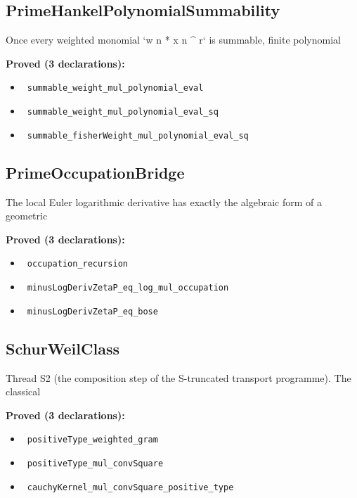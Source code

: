 \documentclass{report}
\theoremstyle{definition}
\begin{document}
\subsection{PrimeHankelPolynomialSummability}
Once every weighted monomial `w n * x n ^ r` is summable, finite polynomial

\noindent\textbf{Proved (3 declarations):}
\begin{itemize}
  \item {}\leanok\ \texttt{summable\_weight\_mul\_polynomial\_eval}
  \item {}\leanok\ \texttt{summable\_weight\_mul\_polynomial\_eval\_sq}
  \item {}\leanok\ \texttt{summable\_fisherWeight\_mul\_polynomial\_eval\_sq}
\end{itemize}

\subsection{PrimeOccupationBridge}
The local Euler logarithmic derivative has exactly the algebraic form of a geometric

\noindent\textbf{Proved (3 declarations):}
\begin{itemize}
  \item {}\leanok\ \texttt{occupation\_recursion}
  \item {}\leanok\ \texttt{minusLogDerivZetaP\_eq\_log\_mul\_occupation}
  \item {}\leanok\ \texttt{minusLogDerivZetaP\_eq\_bose}
\end{itemize}

\subsection{SchurWeilClass}
Thread S2 (the composition step of the S-truncated transport programme). The classical

\noindent\textbf{Proved (3 declarations):}
\begin{itemize}
  \item {}\leanok\ \texttt{positiveType\_weighted\_gram}
  \item {}\leanok\ \texttt{positiveType\_mul\_convSquare}
  \item {}\leanok\ \texttt{cauchyKernel\_mul\_convSquare\_positive\_type}
\end{itemize}
\end{document}
